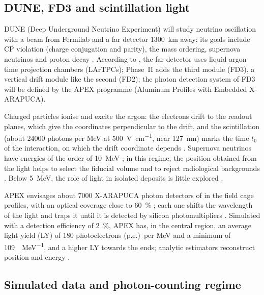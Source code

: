 \label{sec:problema}

\subsection{DUNE, FD3 and scintillation light}
\label{sec:detector}

DUNE (Deep Underground Neutrino Experiment) will study neutrino oscillation with a beam from Fermilab and a far detector \qty{1300}{\km} away; its goals include CP violation (charge conjugation and parity), the mass ordering, supernova neutrinos and proton decay \citep{abi2020volume}. According to \citet{abud2024dunephase}, the far detector uses liquid argon time projection chambers (LArTPCs); Phase~II adds the third module (FD3), a vertical drift module like the second (FD2); the photon detection system of FD3 will be defined by the APEX programme (Aluminum Profiles with Embedded X-ARAPUCA).

Charged particles ionise and excite the argon: the electrons drift to the readout planes, which give the coordinates perpendicular to the drift, and the scintillation (about \num{24000} photons per MeV at \qty{500}{\V\per\cm}, near \qty{127}{\nm}) marks the time $t_0$ of the interaction, on which the drift coordinate depends \citep{abi2020volume}. Supernova neutrinos have energies of the order of \qty{10}{\MeV} \citep{abi2021supernova}; in this regime, the position obtained from the light helps to select the fiducial volume and to reject radiological backgrounds \citep{paulucci2022dune}. Below \qty{5}{\MeV}, the role of light in isolated deposits is little explored \citep{caratelli2022low}.

APEX envisages about \num{7000} X-ARAPUCA photon detectors of  in the field cage profiles, with an optical coverage close to \qty{60}{\percent} \citep{marinho2025apex}; each one shifts the wavelength of the light and traps it until it is detected by silicon photomultipliers \citep{machado2018xarapuca}. Simulated with a detection efficiency of \qty{2}{\percent}, APEX has, in the central region, an average light yield (LY) of \num{180} photoelectrons (p.e.)\ per MeV and a minimum of \qty{109}{\pe\per\MeV}, and a higher LY towards the ends; analytic estimators reconstruct position and energy \citep{marinho2025apex}.

\subsection{Simulated data and photon-counting regime}
\label{sec:dados}

